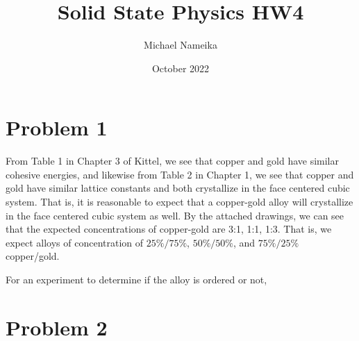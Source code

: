 \documentclass{article}
\title{Solid State Physics HW4}
\author{Michael Nameika}
\date{October 2022}
\begin{document}
\maketitle

\section*{Problem 1}

From Table 1 in Chapter 3 of Kittel, we see that copper and gold have similar cohesive energies, and likewise from Table 2 in Chapter 1, we see that copper and gold have similar lattice constants and both crystallize in the face centered cubic system. That is, it is reasonable to expect that a copper-gold alloy will crystallize in the face centered cubic system as well. By the attached drawings, we can see that the expected concentrations of copper-gold are 3:1, 1:1, 1:3. That is, we expect alloys of concentration of $25\%/75\%$, $50\%/50\%$, and $75\%/25\%$ copper/gold.

For an experiment to determine if the alloy is ordered or not, 


\section*{Problem 2}
\end{document}
